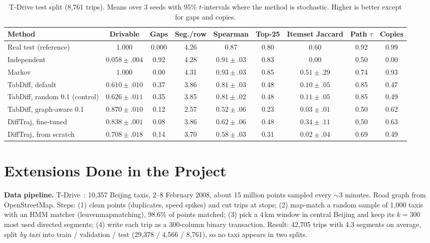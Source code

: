 \documentclass[10pt,twocolumn,a4paper]{article}
\begin{document}
\begin{table}[t]
\centering
\caption{T-Drive test split (8,761 trips). Means over 3 seeds with 95\% $t$-intervals where the method is stochastic. Higher is better except for gaps and copies.}
\label{tab:main}
\begin{tabular}{lcccccccc}
\toprule
Method & Drivable & Gaps & Seg./row & Spearman & Top-25 & Itemset Jaccard & Path $\tau$ & Copies \\
\midrule
Real test (reference) & 1.000 & 0.000 & 4.26 & 0.87 & 0.80 & 0.60 & 0.92 & 0.99 \\
Independent & $0.058\pm.004$ & 0.92 & 4.28 & $0.91\pm.03$ & 0.83 & 0.00 & 0.50 & 0.00 \\
Markov & $1.000$ & 0.00 & 4.31 & $0.93\pm.03$ & 0.85 & $0.51\pm.29$ & 0.74 & 0.93 \\
\midrule
TabDiff, default & $0.610\pm.010$ & 0.37 & 3.86 & $0.81\pm.03$ & 0.48 & $0.10\pm.05$ & 0.85 & 0.47 \\
TabDiff, random 0.1 (control) & $0.626\pm.011$ & 0.35 & 3.85 & $0.81\pm.02$ & 0.48 & $0.11\pm.05$ & 0.85 & 0.49 \\
TabDiff, graph-aware 0.1 & $0.870\pm.010$ & 0.12 & 2.57 & $0.52\pm.06$ & 0.23 & $0.03\pm.01$ & 0.50 & 0.62 \\
\midrule
DiffTraj, fine-tuned & $0.838\pm.001$ & 0.08 & 3.86 & $0.62\pm.06$ & 0.48 & $0.34\pm.11$ & 0.50 & 0.63 \\
DiffTraj, from scratch & $0.708\pm.018$ & 0.14 & 3.70 & $0.58\pm.03$ & 0.31 & $0.02\pm.04$ & 0.69 & 0.49 \\
\bottomrule
\end{tabular}
\end{table}

\section{Extensions Done in the Project}
\label{sec:g}
\textbf{Data pipeline.} T-Drive~\cite{tdrive}: 10,357 Beijing taxis, 2--8 February 2008, about 15 million
points sampled every $\sim$3 minutes. Road graph from OpenStreetMap. Steps:
(1) clean points (duplicates, speed spikes) and cut trips at stops;
(2) map-match a random sample of 1,000 taxis with an HMM matcher (leuvenmapmatching), 98.6\% of points
matched; (3) pick a 4\,km window in central Beijing and keep its $k=300$ most used directed segments;
(4) write each trip as a 300-column binary transaction. Result: 42,705 trips with 4.3 segments on
average, split \emph{by taxi} into train / validation / test (29,378 / 4,566 / 8,761), so no taxi appears in
two splits.
\end{document}
